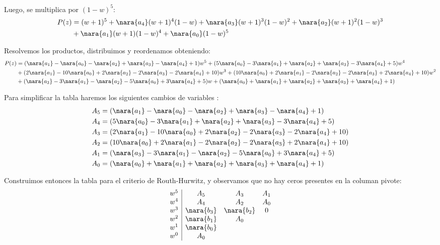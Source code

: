 Luego, se multiplica por $(1-w)^5$:
\begin{align}
    P(z) &=  ({w+1})^5 +\nara{a_4}({w+1})^4(1-w)+ \nara{a_3}({w+1})^3(1-w)^2 + \nara{a_2} ({w+1})^2 (1-w)^3 \\
    &+ \nara{a_1} ({w+1})(1-w)^4+ \nara{a_0}(1-w)^5
\end{align}

Resolvemos los productos, distribuimos y reordenamos obteniendo:
\begin{align}
  P(z) &= (\nara{a_1} - \nara{a_0} - \nara{a_2} + \nara{a_3} - \nara{a_4} + 1) w^5 + (5\nara{a_0} - 3\nara{a_1} + \nara{a_2} + \nara{a_3} - 3\nara{a_4} + 5) w^4 \\
  &+ (2\nara{a_1} - 10\nara{a_0} + 2\nara{a_2} - 2\nara{a_3} - 2\nara{a_4} + 10) w^3 + (10\nara{a_0} + 2\nara{a_1} - 2\nara{a_2} - 2\nara{a_3} + 2\nara{a_4} + 10) w^2 \\
  &+ (\nara{a_3} - 3\nara{a_1} - \nara{a_2} - 5\nara{a_0} + 3\nara{a_4} + 5) w + (\nara{a_0} + \nara{a_1} + \nara{a_2} + \nara{a_3} + \nara{a_4} + 1)
\end{align}

Para simplificar la tabla haremos los siguientes cambios de variables :
\begin{align}
    A_5&= (\nara{a_1} - \nara{a_0} - \nara{a_2} + \nara{a_3} - \nara{a_4} + 1)\\
    A_4 &=(5\nara{a_0} - 3\nara{a_1} + \nara{a_2} + \nara{a_3} - 3\nara{a_4} + 5) \\
    A_3 &= (2\nara{a_1} - 10\nara{a_0} + 2\nara{a_2} - 2\nara{a_3} - 2\nara{a_4} + 10)\\
    A_2 &=(10\nara{a_0} + 2\nara{a_1} - 2\nara{a_2} - 2\nara{a_3} + 2\nara{a_4} + 10)\\
    A_1 &=(\nara{a_3} - 3\nara{a_1} - \nara{a_2} - 5\nara{a_0} + 3\nara{a_4} + 5)\\
    A_0 &= (\nara{a_0} + \nara{a_1} + \nara{a_2} + \nara{a_3} + \nara{a_4} + 1)
\end{align}

Construimos entonces la tabla para el criterio de Routh-Hurwitz, y observamos
que no hay ceros presentes en la columan pivote:
\begin{equation}
  \begin{array}{c|ccc}
    w^5 & A_5 & A_3& A_1 \\
    w^4 & A_4 & A_2 & A_0 \\
    w^3 & \nara{b_3}  &  \nara{b_2} &0\\
    w^2 & \nara{b_1}  & A_0\\
    w^1 & \nara{b_0}\\
    w^0 & A_0
  \end{array}
\end{equation}

